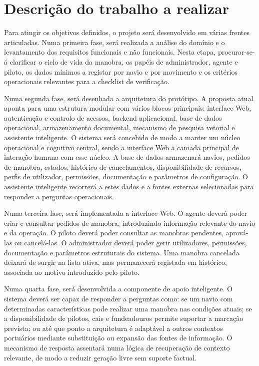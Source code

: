 \documentclass[a4paper,12pt]{report}
\begin{document}
\section{Descrição do trabalho a realizar}

Para atingir os objetivos definidos, o projeto será desenvolvido em várias frentes articuladas. Numa primeira fase, será realizada a análise do domínio e o levantamento dos requisitos funcionais e não funcionais. Nesta etapa, procurar-se-á clarificar o ciclo de vida da manobra, os papéis de administrador, agente e piloto, os dados mínimos a registar por navio e por movimento e os critérios operacionais relevantes para a checklist de verificação.

Numa segunda fase, será desenhada a arquitetura do protótipo. A proposta atual aponta para uma estrutura modular com vários blocos principais: interface Web, autenticação e controlo de acessos, backend aplicacional, base de dados operacional, armazenamento documental, mecanismo de pesquisa vetorial e assistente inteligente. O sistema será concebido de modo a manter um núcleo operacional e cognitivo central, sendo a interface Web a camada principal de interação humana com esse núcleo. A base de dados armazenará navios, pedidos de manobra, estados, histórico de cancelamentos, disponibilidade de recursos, perfis de utilizador, permissões, documentação e parâmetros de configuração. O assistente inteligente recorrerá a estes dados e a fontes externas selecionadas para responder a perguntas operacionais.

Numa terceira fase, será implementada a interface Web. O agente deverá poder criar e consultar pedidos de manobra, introduzindo informação relevante do navio e da operação. O piloto deverá poder consultar as manobras pendentes, aprová-las ou cancelá-las. O administrador deverá poder gerir utilizadores, permissões, documentação e parâmetros estruturais do sistema. Uma manobra cancelada deixará de surgir na lista ativa, mas permanecerá registada em histórico, associada ao motivo introduzido pelo piloto.

Numa quarta fase, será desenvolvida a componente de apoio inteligente. O sistema deverá ser capaz de responder a perguntas como: se um navio com determinadas características pode realizar uma manobra nas condições atuais; se a disponibilidade de pilotos, cais e fundeadouros permite suportar a marcação prevista; ou até que ponto a arquitetura é adaptável a outros contextos portuários mediante substituição ou expansão das fontes de informação. O mecanismo de resposta assentará numa lógica de recuperação de contexto relevante, de modo a reduzir geração livre sem suporte factual.
\end{document}

